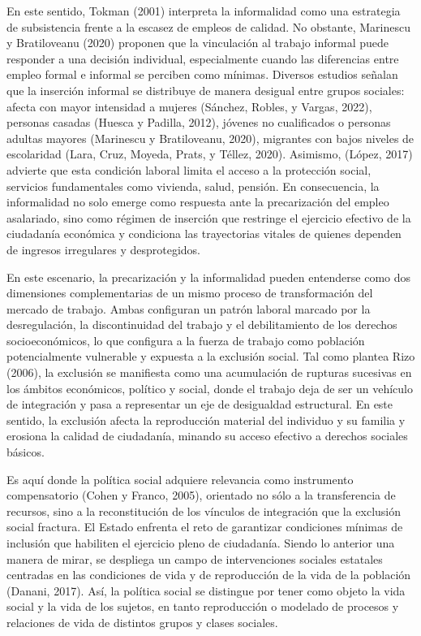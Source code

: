 \documentclass[
  spanish,
  11.5pt,
  170mm x 240mmpaper,
]{scrbook}
\begin{document}
En este sentido, Tokman (2001) interpreta la informalidad como una
estrategia de subsistencia frente a la escasez de empleos de calidad. No
obstante, Marinescu y Bratiloveanu (2020) proponen que la vinculación al
trabajo informal puede responder a una decisión individual,
especialmente cuando las diferencias entre empleo formal e informal se
perciben como mínimas. Diversos estudios señalan que la inserción
informal se distribuye de manera desigual entre grupos sociales: afecta
con mayor intensidad a mujeres (Sánchez, Robles, y Vargas, 2022),
personas casadas (Huesca y Padilla, 2012), jóvenes no cualificados o
personas adultas mayores (Marinescu y Bratiloveanu, 2020), migrantes con
bajos niveles de escolaridad (Lara, Cruz, Moyeda, Prats, y Téllez,
2020). Asimismo, (López, 2017) advierte que esta condición laboral
limita el acceso a la protección social, servicios fundamentales como
vivienda, salud, pensión. En consecuencia, la informalidad no solo
emerge como respuesta ante la precarización del empleo asalariado, sino
como régimen de inserción que restringe el ejercicio efectivo de la
ciudadanía económica y condiciona las trayectorias vitales de quienes
dependen de ingresos irregulares y desprotegidos.

En este escenario, la precarización y la informalidad pueden entenderse
como dos dimensiones complementarias de un mismo proceso de
transformación del mercado de trabajo. Ambas configuran un patrón
laboral marcado por la desregulación, la discontinuidad del trabajo y el
debilitamiento de los derechos socioeconómicos, lo que configura a la
fuerza de trabajo como población potencialmente vulnerable y expuesta a
la exclusión social. Tal como plantea Rizo (2006), la exclusión se
manifiesta como una acumulación de rupturas sucesivas en los ámbitos
económicos, político y social, donde el trabajo deja de ser un vehículo
de integración y pasa a representar un eje de desigualdad estructural.
En este sentido, la exclusión afecta la reproducción material del
individuo y su familia y erosiona la calidad de ciudadanía, minando su
acceso efectivo a derechos sociales básicos.

Es aquí donde la política social adquiere relevancia como instrumento
compensatorio (Cohen y Franco, 2005), orientado no sólo a la
transferencia de recursos, sino a la reconstitución de los vínculos de
integración que la exclusión social fractura. El Estado enfrenta el reto
de garantizar condiciones mínimas de inclusión que habiliten el
ejercicio pleno de ciudadanía. Siendo lo anterior una manera de mirar,
se despliega un campo de intervenciones sociales estatales centradas en
las condiciones de vida y de reproducción de la vida de la población
(Danani, 2017). Así, la política social se distingue por tener como
objeto la vida social y la vida de los sujetos, en tanto reproducción o
modelado de procesos y relaciones de vida de distintos grupos y clases
sociales.
\end{document}
